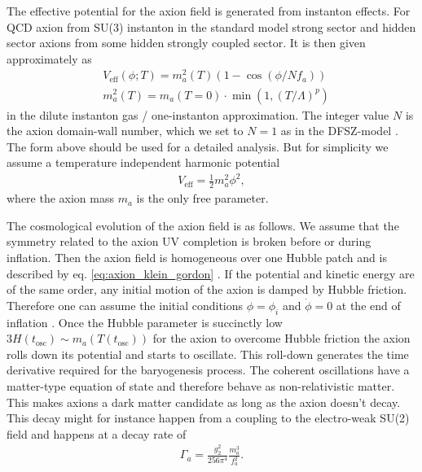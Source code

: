 \documentclass[13pt,a4paper,titlepage]{article}
\begin{document}
The effective potential for the axion field is generated from instanton effects.
For QCD axion from SU(3) instanton in the standard model strong sector and hidden sector axions from some hidden strongly coupled sector. It is then given approximately as \cite[sec. 2.2]{Axion_Cosmology_Marsh_2016}
\begin{align}
   &V_\mathrm{eff}(\phi; T) = m_a^2(T) (1 - \cos(\phi / N f_a)) \\
   &m_a^2(T) = m_a(T = 0) \cdot \min\left(1, \left( T / \Lambda \right)^p \right)
\end{align}
in the dilute instanton gas / one-instanton approximation.
The integer value $N$ is the axion domain-wall number, which we set to $N = 1$ as in the DFSZ-model \cite[sec. 2.7]{Di_Luzio_2020_Landscape_of_QCD_Axion_models}.
The form above should be used for a detailed analysis. But for simplicity we assume a temperature independent harmonic potential
\begin{align}
    V_\mathrm{eff} = \frac{1}{2} m_a^2 \phi^2,
\end{align}
where the axion mass $m_a$ is the only free parameter.

\noindent
The cosmological evolution of the axion field is as follows. We assume that the
symmetry related to the axion UV completion is broken before or during inflation.
Then the axion field is homogeneous over one Hubble patch and is described by eq. \eqref{eq:axion_klein_gordon} \cite[sec. 4, eps. 4.7]{Axion_Cosmology_Marsh_2016}.
If the potential and kinetic energy are of the same order, any initial motion of the axion is damped by Hubble friction. Therefore one can assume the initial conditions $\phi = \phi_i$ and $\dot{\phi} = 0$ at the end of inflation \cite[sec. IV.A]{Axion_cosmology_Wantz_2010}.
Once the Hubble parameter is succinctly low $3 H(t_\mathrm{osc}) \sim m_a(T(t_\mathrm{osc}))$ for the axion to overcome Hubble friction the axion rolls down its potential and starts to oscillate. This roll-down generates the time derivative
required for the baryogenesis process.
The coherent oscillations have a matter-type equation of state and therefore behave as non-relativistic matter. This makes axions a dark matter candidate as long as the axion
doesn't decay.
This decay might for instance happen from a coupling to the electro-weak SU(2) field and happens at a decay rate of \cite[eq. 15]{Axion_leptogenesis_Kusenko_2015}
\begin{align}
    \Gamma_a = \frac{g_2^2}{256 \pi^4} \frac{m_a^3}{f_a^2}.
\end{align}
\end{document}
